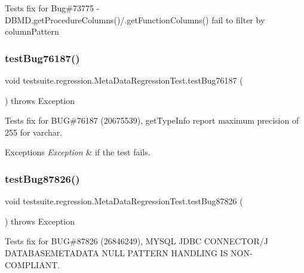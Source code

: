 Tests fix for Bug\#73775 -\/ D\+B\+M\+D.\+get\+Procedure\+Columns()/.get\+Function\+Columns() fail to filter by column\+Pattern \mbox{\label{classtestsuite_1_1regression_1_1_meta_data_regression_test_a59b663373c79eec136ca0c2473dac25c}} 
\subsubsection{\texorpdfstring{test\+Bug76187()}{testBug76187()}}
{\footnotesize\ttfamily void testsuite.\+regression.\+Meta\+Data\+Regression\+Test.\+test\+Bug76187 (\begin{DoxyParamCaption}{ }\end{DoxyParamCaption}) throws Exception}

Tests fix for B\+UG\#76187 (20675539), get\+Type\+Info report maximum precision of 255 for varchar.


\begin{DoxyExceptions}{Exceptions}
{\em Exception} & if the test fails. \\
\hline
\end{DoxyExceptions}
\mbox{\label{classtestsuite_1_1regression_1_1_meta_data_regression_test_a0182fb63c3dfdf76644200cbca0614db}} 
\subsubsection{\texorpdfstring{test\+Bug87826()}{testBug87826()}}
{\footnotesize\ttfamily void testsuite.\+regression.\+Meta\+Data\+Regression\+Test.\+test\+Bug87826 (\begin{DoxyParamCaption}{ }\end{DoxyParamCaption}) throws Exception}

Tests fix for B\+UG\#87826 (26846249), M\+Y\+S\+QL J\+D\+BC C\+O\+N\+N\+E\+C\+T\+O\+R/J D\+A\+T\+A\+B\+A\+S\+E\+M\+E\+T\+A\+D\+A\+TA N\+U\+LL P\+A\+T\+T\+E\+RN H\+A\+N\+D\+L\+I\+NG IS N\+O\+N-\/\+C\+O\+M\+P\+L\+I\+A\+NT.


